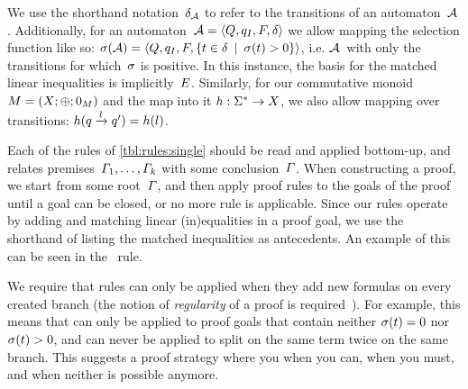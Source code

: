 \documentclass[acmsmall,review,anonymous,screen]{acmart}\settopmatter{printfolios=true,printccs=true,printacmref=true}
\theoremstyle{definition}
\begin{document}
We use the shorthand notation~$\delta_{\mathcal{A}}$ to refer to the
transitions of an automaton~$\mathcal{A}$. Additionally, for an
automaton~$\mathcal{A} = \left\langle Q, q_I, F, \delta\right\rangle$ we allow mapping the selection function
like so: $\operatorname{\sigma}(\mathcal{A}) = \left\langle Q, q_I, F,
\left\{t \in \delta \:\mid\: \operatorname{\sigma}(t) > 0\right\}\right\rangle$, i.e.
$\mathcal{A}$~with only the transitions for which~$\operatorname{\sigma}$ is positive. In this
instance, the basis for the matched linear inequalities is
implicitly~$E$. Similarly, for our commutative monoid $M =
\left(X;\operatorname{\oplus};0_{M}\right)$ and the map into it $h : \Sigma^*
\rightarrow X$, we also allow mapping over transitions:
$h(q \xrightarrow{l} q') = h(l)$.

Each of the rules of \cref{tbl:rules:single} should be read and
applied bottom-up, and relates
premises~$\varGamma_1, \ldots, \varGamma_k$ with some
conclusion~$\varGamma$. When constructing a proof, we start from some
root~$\varGamma$, and then apply proof rules to the goals of the proof
until a goal can be closed, or no more rule is applicable. Since
our rules operate by adding and matching linear (in)equalities in a proof goal,
we use the shorthand of listing the matched inequalities as antecedents. An
example of this can be seen in the~\Propagate{} rule. 

We require that rules can only be applied when they add new formulas
on every created branch (the notion of \emph{regularity} of a proof is
required~\cite{Fitting96a}). For example, this means that \Split{} can
only be applied to proof goals that contain neither
$\operatorname{\sigma}(t) = 0$ nor $\operatorname{\sigma}(t) > 0$, and can
never be applied to split on the same term twice on the same branch.
This suggests a proof strategy where you \Propagate{} when you can, \Split{}
when you must, and \Subsume{} when neither is possible anymore.
\end{document}
